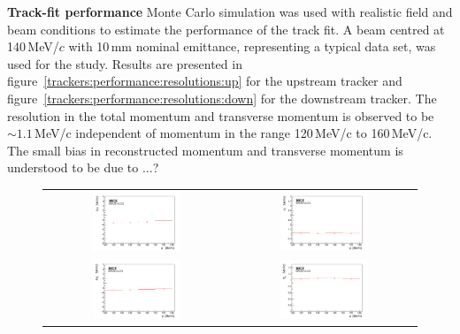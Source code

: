 \noindent\textbf{Track-fit performance}
\noindent
Monte Carlo simulation was used with realistic field and beam
conditions to estimate the performance of the track fit.
A beam centred at 140\,MeV/$c$ with 10\,mm nominal emittance,
representing a typical data set, was used for the study.
Results are presented in
figure~\ref{trackers:performance:resolutions:up} for the upstream
tracker and figure~\ref{trackers:performance:resolutions:down} for the
downstream tracker.
The resolution in the total momentum and transverse momentum is
observed to be $\sim 1.1$\,MeV/c independent of momentum in the range
120\,MeV/c to 160\,MeV/c.
The small bias in reconstructed momentum and transverse momentum is
{\color{red} understood to be due to ...?}
\begin{figure}
  \begin{center}
    \begin{tabular}{cc}
      \includegraphics[width=0.5\textwidth]{upstream_p_bias_p_logo.pdf} &	
      \includegraphics[width=0.5\textwidth]{upstream_p_resolution_p_logo.pdf} \\
      \includegraphics[width=0.5\textwidth]{upstream_pt_bias_p_logo.pdf} &
      \includegraphics[width=0.5\textwidth]{upstream_pt_resolution_p_logo.pdf}

\end{tabular}
\end{center}
\end{figure}
